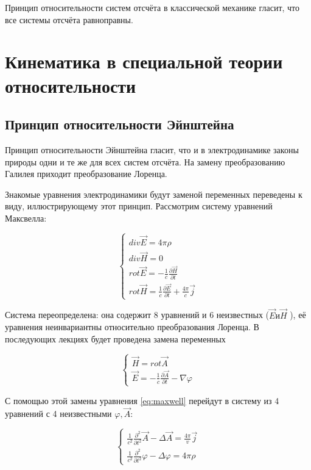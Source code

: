 \documentclass{article}
\begin{document}
Принцип относительности систем отсчёта в классической механике гласит, что все системы отсчёта равноправны.

\section{Кинематика в специальной теории относительности}

\subsection{Принцип относительности Эйнштейна}

Принцип относительности Эйнштейна гласит, что и в электродинамике законы природы одни и те же для всех систем отсчёта. На замену преобразованию Галилея приходит преобразование Лоренца.

Знакомые уравнения электродинамики будут заменой переменных переведены к виду, иллюстрирующему этот принцип. Рассмотрим систему уравнений Максвелла:

\begin{equation}\label{eq:maxwell}
    \begin{cases}
    div\vec{E}=4\pi\rho\\
    div\vec{H}=0\\
    rot\vec{E}=-\frac{1}{c}\frac{\partial\vec{H}}{\partial t}\\
    rot\vec{H}=\frac{1}{c}\frac{\partial\vec{E}}{\partial t}+\frac{4\pi}{c}\vec{j}
    \end{cases}
\end{equation}

Система переопределена: она содержит 8 уравнений и 6 неизвестных ($\vec{E} и \vec{H}$
), её уравнения неинвариантны относительно преобразования Лоренца. В последующих лекциях будет проведена замена переменных

\begin{equation}
    \begin{cases}
    \vec{H}=rot\vec{A}\\
    \vec{E}=-\frac{1}{c}\frac{\partial\vec{A}}{\partial t}-\nabla\varphi
    \end{cases}
\end{equation}

С помощью этой замены уравнения \eqref{eq:maxwell} перейдут в систему из 4 уравнений с 4 неизвестными $\varphi,\vec{A}$:

\begin{equation}\label{eq:maxwell_a}
    \begin{cases}
    \frac{1}{c^2}\frac{\partial^2}{\partial t^2}\vec{A}-\Delta\vec{A}=\frac{4\pi}{v}\vec{j}\\
    \frac{1}{c^2}\frac{\partial^2}{\partial t^2}\varphi-\Delta\varphi=4\pi\rho
    \end{cases}
\end{equation}
\end{document}
